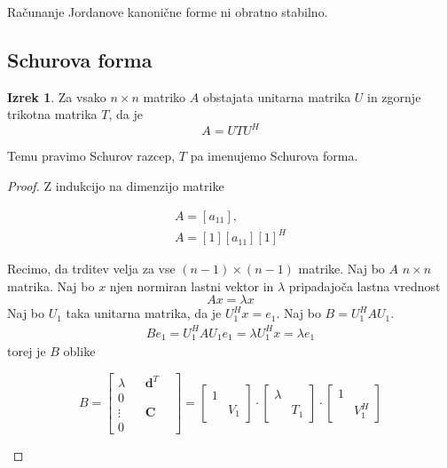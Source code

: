 \documentclass[a4paper,12pt]{article}
\theoremstyle{definition}
\newtheorem{theorem}[counter]{Izrek}
\theoremstyle{remark}
\begin{document}
Računanje Jordanove kanonične forme ni obratno stabilno.

\subsection{Schurova forma}

\begin{theorem}
    Za vsako $n \times n$ matriko $A$ obstajata unitarna matrika $U$ in zgornje trikotna matrika $T$, da je
    \begin{equation*}
        A = U T U^H
    \end{equation*}

    Temu pravimo Schurov razcep, $T$ pa imenujemo Schurova forma.
\end{theorem}

\begin{proof}
    Z indukcijo na dimenzijo matrike

    \begin{gather*}
        A = [a_{11}], \\
        A = [1] [a_{11}] [1]^H
    \end{gather*}
    
    Recimo, da trditev velja za vse $(n-1)\times(n-1)$ matrike. Naj bo $A$ $n\times n$ matrika. Naj bo $x$ njen normiran lastni vektor in $\lambda$
    pripadajoča lastna vrednost
    \begin{equation*}
        Ax = \lambda x
    \end{equation*}
    Naj bo $U_1$ taka unitarna matrika, da je $U_1^H x = e_1$. Naj bo $B = U_1^H A U_1$.
    \begin{gather*}
        B e_1 = U_1^H A U_1 e_1 = \lambda U_1^H x = \lambda e_1
    \end{gather*}
    torej je $B$ oblike
    \begin{center}
        \begin{equation*}
            B = 
            \begin{bmatrix}
                \lambda &  & \mathbf{d}^T & \\
                0 & & & \\
                \vdots & & \mathbf{C} & \\
                0 & & &
            \end{bmatrix} = \begin{bmatrix}
                1 &  \\
                 & V_1
                \end{bmatrix} \cdot \begin{bmatrix}
                    \lambda &  \\
                     & T_1
                    \end{bmatrix} \cdot \begin{bmatrix}
                        1 &  \\
                         & V_1^H
                        \end{bmatrix}
        \end{equation*}
    \end{center}


\end{proof}
\end{document}
